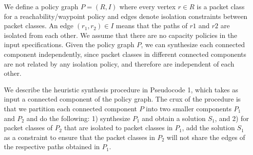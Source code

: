 We define a policy graph $P = (R, I)$ where every vertex $r \in R$
is a packet class for a reachability/waypoint policy and edges
denote isolation constraints between packet classes.
An edge $(r_1,r_2) \in I$  means that the paths of $r1$ and $r2$ are
isolated from each other. We assume that there are no capacity policies
in the input specifications. 
  Given the policy graph $P$, we
can synthesize each connected component independently, since packet
classes in different connected components are not related by any
isolation policy, and therefore are independent of each other.

We describe the heuristic synthesis procedure in Pseudocode 1,
which takes as input a connected component of the policy graph.
 The crux of the procedure is that we partition each connected component $P$
  into two smaller components $P_1$ and $P_2$
  and do the following:
1) synthesize $P_1$ and obtain a solution $S_1$, and
2) for packet classes of $P_2$ that are
isolated to packet classes in $P_1$, 
add the solution $S_1$ as a constraint to ensure that the
packet classes in $P_2$ will not share the edges of the respective
paths obtained in $P_1$. 

